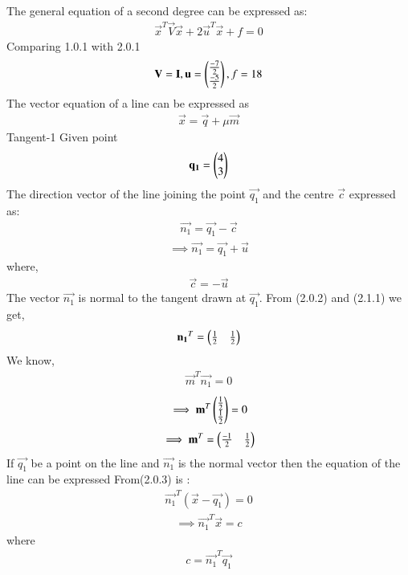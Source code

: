 
The general equation of a second degree can be expressed as: 
\begin{align}
   \vec{x}^T\vec{V}\vec{x}+2\vec{u}^T\vec{x}+f=0
\end{align}
Comparing 1.0.1 with 2.0.1
\begin{align}
  \mathbf{V}=\mathbf{I}, \mathbf{u}=\begin{pmatrix}\frac{-7}{2}\\\frac{-5}{2}\end{pmatrix}, f=18
\end{align}
The vector equation of a line can be expressed as  
\begin{align}
\vec{x}=\vec{q}+ \mu \vec{m}
\end{align}
{Tangent-1} Given point
\begin{align}
\mathbf{q_1}=\begin{pmatrix}4\\3\end{pmatrix}
\end{align}
The direction vector of the line joining the point $\vec{q_1}$ and the centre $\vec{c}$ expressed as:
\begin{align}
 \vec{n_1}=\vec{q_1}-\vec{c}
 \end{align}
\begin{align}
\implies \vec{n_1}=\vec{q_1}+\vec{u}      
\end{align}
where, 
\begin{align}
\vec{c}=-\vec{u} 
\end{align}
The vector $\vec{n_1}$ is normal to the tangent drawn at $\vec{q_1}$. 
From (2.0.2) and (2.1.1) we get,
\begin{align}
\mathbf{n_1}^T=\begin{pmatrix}\frac{1}{2} & \frac{1}{2}\end{pmatrix}
\end{align}
We know,
\begin{align}
\vec{m}^T\vec{n_1} = 0
\end{align}
\begin{align}
\implies \mathbf{m}^T\begin{pmatrix}\frac{1}{2}\\ \frac{1}{2}\end{pmatrix} = 0
\end{align}
\begin{align}
\implies \mathbf{m}^T= \begin{pmatrix}\frac{-1}{2} & \frac{1}{2}\end{pmatrix}
\end{align}
If $\vec{q_1}$ be a point on the line and $\vec{n_1}$ is the normal vector then
the equation of the line can be expressed From(2.0.3) is :
\begin{align}
 \vec{n_1}^T (\vec{x}-\vec{q_1})=0
\end{align}
\begin{align}
 \implies \vec{n_1}^T \vec{x}= c
\end{align}
where
\begin{align}
 c=\vec{n_1}^T \vec{q_1}
\end{align}

